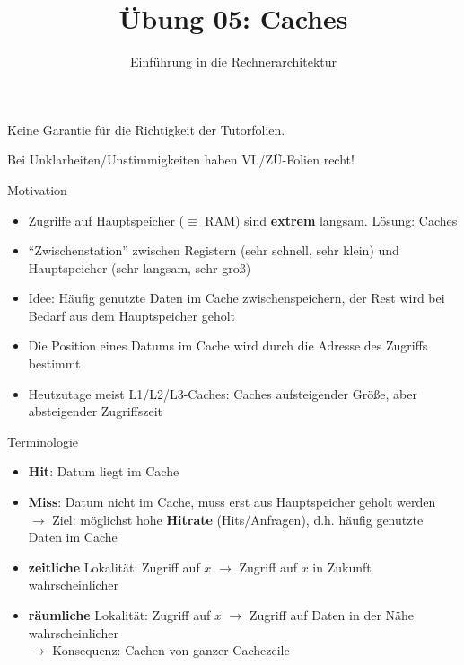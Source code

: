 

\title{Übung 05: Caches}
\subtitle{Einführung in die Rechnerarchitektur}
\date{}



\maketitle

\begin{frame}[c, fragile]{}{}
	\begin{center}
		\LARGE  Keine Garantie für die Richtigkeit der Tutorfolien.

		\Large Bei Unklarheiten/Unstimmigkeiten haben VL/ZÜ-Folien recht!
	\end{center}
\end{frame}

\begin{frame}[fragile, c]{Motivation}{}
	\begin{itemize}
		\item Zugriffe auf Hauptspeicher ($\equiv$ RAM) sind \textbf{extrem} langsam. Lösung: Caches
		\item \enquote{Zwischenstation} zwischen Registern (sehr schnell, sehr klein) und Hauptspeicher (sehr langsam, sehr groß)
		\item Idee: Häufig genutzte Daten im Cache zwischenspeichern, der Rest wird bei Bedarf aus dem Hauptspeicher geholt
		\item Die Position eines Datums im Cache wird durch die Adresse des Zugriffs bestimmt
		\item Heutzutage meist L1/L2/L3-Caches: Caches aufsteigender Größe, aber absteigender Zugriffszeit
	\end{itemize}
\end{frame}


\begin{frame}[t]{Terminologie}
	\vspace*{1cm}
	\begin{itemize}
		\item \textbf{Hit}: Datum liegt im Cache
		\item \textbf{Miss}: Datum nicht im Cache, muss erst aus Hauptspeicher geholt werden\\$\rightarrow$ Ziel: möglichst hohe \textbf{Hitrate} (Hits/Anfragen), d.h. häufig genutzte Daten im Cache

	\end{itemize}
	\vfill{}
	\pause
	\begin{itemize}
		\item \textbf{zeitliche} Lokalität: Zugriff auf $x$ $\rightarrow$ Zugriff auf $x$ in Zukunft wahrscheinlicher
		\item \textbf{räumliche} Lokalität: Zugriff auf $x$ $\rightarrow$ Zugriff auf Daten in der Nähe wahrscheinlicher\\$\rightarrow$ Konsequenz: Cachen von ganzer Cachezeile
	\end{itemize}
\end{frame}


